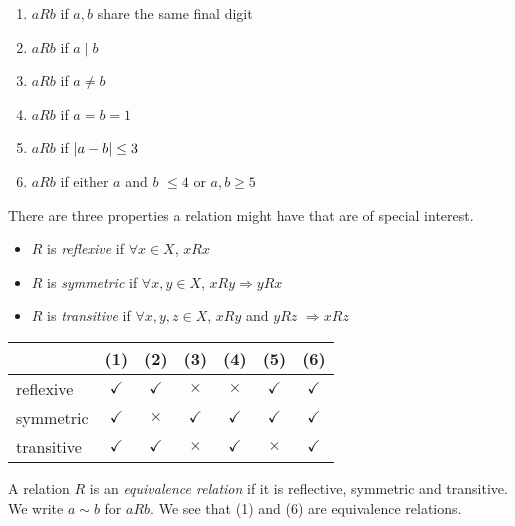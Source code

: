 \documentclass{article}
\begin{document}
\begin{eg}\leavevmode
    \begin{enumerate}[label=(\arabic*)]
        \item $aRb$ if $a, b$ share the same final digit
        \item $aRb$ if $a \mid b$
        \item $aRb$ if $a \neq b$
        \item $aRb$ if $a = b = 1$
        \item $aRb$ if $\left\lvert a - b\right\rvert \leq 3$
        \item $aRb$ if either $a$ and $b$ $\leq 4$ or $a, b \geq 5$ 
    \end{enumerate}
\end{eg}
There are three properties a relation might have that are of special interest.
\begin{itemize}
    \item $R$ is \emph{reflexive} if $\forall x \in X$, $xRx$
    \item $R$ is \emph{symmetric} if $\forall x,y \in X$, $xRy \Rightarrow yRx$
    \item $R$ is \emph{transitive} if $\forall x,y,z \in X$, $xRy$ and $yRz$ $\Rightarrow xRz$
\end{itemize}

\begin{eg}\leavevmode
    \begin{center}
        \begin{tabular}{l|cccccc}
            & (1) & (2) & (3) & (4) & (5) & (6) \\
            \hline
            reflexive  & $\checkmark$ & $\checkmark$ & $\times$     & $\times$     & $\checkmark$ & $\checkmark$ \\
            symmetric  & $\checkmark$ & $\times$     & $\checkmark$ & $\checkmark$ & $\checkmark$ & $\checkmark$ \\
            transitive & $\checkmark$ & $\checkmark$ & $\times$     & $\checkmark$ & $\times$     & $\checkmark$
        \end{tabular}
    \end{center}
\end{eg}

\begin{defi}
    A relation $R$ is an \emph{equivalence relation} if it is reflective, symmetric and transitive.
    We write $a \sim b$ for $aRb$. 
    We see that (1) and (6) are equivalence relations.
\end{defi}
\end{document}
